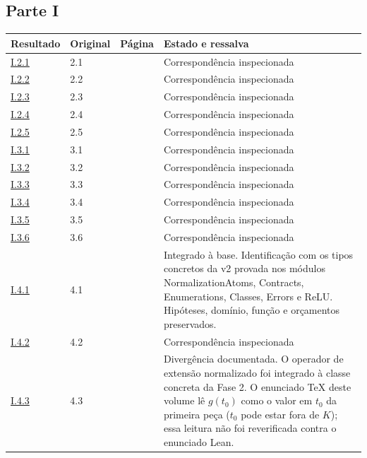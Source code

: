 \documentclass[12pt,a4paper]{article}
\theoremstyle{preciso}
\theoremstyle{definition}
\theoremstyle{preciso}
\theoremstyle{preciso}
\theoremstyle{preciso}
\theoremstyle{preciso}
\theoremstyle{definition}
\theoremstyle{preciso}
\theoremstyle{definition}
\theoremstyle{preciso}
\theoremstyle{preciso}
\theoremstyle{definition}
\begin{document}
\begin{singlespace}
\subsection*{Parte I}
\small
\begin{longtable}{@{}p{.11\linewidth}p{.09\linewidth}p{.09\linewidth}p{.59\linewidth}@{}}
\toprule Resultado & Original & Página & Estado e ressalva\\\midrule\endhead
\hyperref[map:artigo_1:2.1]{I.2.1} & 2.1 & \pageref{map:artigo_1:2.1} & Correspondência inspecionada\\[4pt]
\hyperref[map:artigo_1:2.2]{I.2.2} & 2.2 & \pageref{map:artigo_1:2.2} & Correspondência inspecionada\\[4pt]
\hyperref[map:artigo_1:2.3]{I.2.3} & 2.3 & \pageref{map:artigo_1:2.3} & Correspondência inspecionada\\[4pt]
\hyperref[map:artigo_1:2.4]{I.2.4} & 2.4 & \pageref{map:artigo_1:2.4} & Correspondência inspecionada\\[4pt]
\hyperref[map:artigo_1:2.5]{I.2.5} & 2.5 & \pageref{map:artigo_1:2.5} & Correspondência inspecionada\\[4pt]
\hyperref[map:artigo_1:3.1]{I.3.1} & 3.1 & \pageref{map:artigo_1:3.1} & Correspondência inspecionada\\[4pt]
\hyperref[map:artigo_1:3.2]{I.3.2} & 3.2 & \pageref{map:artigo_1:3.2} & Correspondência inspecionada\\[4pt]
\hyperref[map:artigo_1:3.3]{I.3.3} & 3.3 & \pageref{map:artigo_1:3.3} & Correspondência inspecionada\\[4pt]
\hyperref[map:artigo_1:3.4]{I.3.4} & 3.4 & \pageref{map:artigo_1:3.4} & Correspondência inspecionada\\[4pt]
\hyperref[map:artigo_1:3.5]{I.3.5} & 3.5 & \pageref{map:artigo_1:3.5} & Correspondência inspecionada\\[4pt]
\hyperref[map:artigo_1:3.6]{I.3.6} & 3.6 & \pageref{map:artigo_1:3.6} & Correspondência inspecionada\\[4pt]
\hyperref[map:artigo_1:4.1]{I.4.1} & 4.1 & \pageref{map:artigo_1:4.1} & Integrado à base. Identificação com os tipos concretos da v2 provada nos módulos NormalizationAtoms, Contracts, Enumerations, Classes, Errors e ReLU. Hipóteses, domínio, função e orçamentos preservados.\\[4pt]
\hyperref[map:artigo_1:4.2]{I.4.2} & 4.2 & \pageref{map:artigo_1:4.2} & Correspondência inspecionada\\[4pt]
\hyperref[map:artigo_1:4.3]{I.4.3} & 4.3 & \pageref{map:artigo_1:4.3} & Divergência documentada. O operador de extensão normalizado foi integrado à classe concreta da Fase 2. O enunciado TeX deste volume lê $g(t_0)$ como o valor em $t_0$ da primeira peça ($t_0$ pode estar fora de $K$); essa leitura não foi reverificada contra o enunciado Lean.\\[4pt]

\end{longtable}
\end{singlespace}
\end{document}

